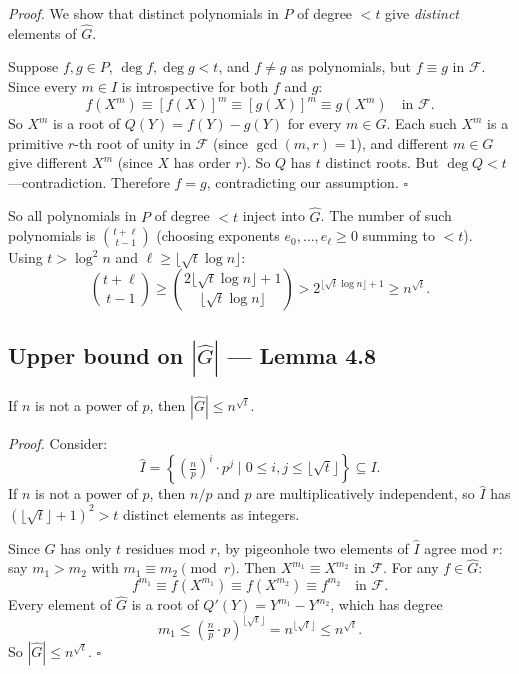 \documentclass[12pt]{article}
\begin{document}
\textit{Proof.} We show that distinct polynomials in $P$ of degree $<t$ give \emph{distinct} elements of $\hat{G}$.

Suppose $f, g\in P$, $\deg f, \deg g < t$, and $f\neq g$ as polynomials, but $f\equiv g$ in $\mathcal{F}$. Since every $m\in I$ is introspective for both $f$ and $g$:
\[
  f(X^m)\equiv[f(X)]^m\equiv[g(X)]^m\equiv g(X^m) \quad\text{in }\mathcal{F}.
\]
So $X^m$ is a root of $Q(Y)=f(Y)-g(Y)$ for every $m\in G$. Each such $X^m$ is a primitive $r$-th root of unity in $\mathcal{F}$ (since $\gcd(m,r)=1$), and different $m\in G$ give different $X^m$ (since $X$ has order $r$). So $Q$ has $t$ distinct roots. But $\deg Q < t$---contradiction. Therefore $f=g$, contradicting our assumption. $\square$

So all polynomials in $P$ of degree $<t$ inject into $\hat{G}$. The number of such polynomials is $\binom{t+\ell}{t-1}$ (choosing exponents $e_0,\ldots,e_\ell\geq 0$ summing to $<t$). Using $t>\log^2 n$ and $\ell\geq\lfloor\sqrt{t}\log n\rfloor$:
\[
  \binom{t+\ell}{t-1}\geq\binom{2\lfloor\sqrt{t}\log n\rfloor+1}{\lfloor\sqrt{t}\log n\rfloor} > 2^{\lfloor\sqrt{t}\log n\rfloor+1} \geq n^{\sqrt{t}}.
\]

\subsection{Upper bound on $|\hat{G}|$ --- Lemma 4.8}

\begin{thmbox}[Lemma 4.8]
If $n$ is not a power of $p$, then $|\hat{G}|\leq n^{\sqrt{t}}$.
\end{thmbox}

\textit{Proof.} Consider:
\[
  \hat{I} = \left\{\left(\tfrac{n}{p}\right)^i\cdot p^j \;\Big|\; 0\leq i,j\leq\lfloor\sqrt{t}\rfloor\right\} \subseteq I.
\]
If $n$ is not a power of $p$, then $n/p$ and $p$ are multiplicatively independent, so $\hat{I}$ has $(\lfloor\sqrt{t}\rfloor+1)^2 > t$ distinct elements as integers.

Since $G$ has only $t$ residues mod $r$, by pigeonhole two elements of $\hat{I}$ agree mod $r$: say $m_1 > m_2$ with $m_1\equiv m_2\pmod{r}$. Then $X^{m_1}\equiv X^{m_2}$ in $\mathcal{F}$. For any $f\in\hat{G}$:
\[
  f^{m_1} \equiv f(X^{m_1}) \equiv f(X^{m_2}) \equiv f^{m_2} \quad\text{in }\mathcal{F}.
\]
Every element of $\hat{G}$ is a root of $Q'(Y)=Y^{m_1}-Y^{m_2}$, which has degree
\[
  m_1\leq\left(\tfrac{n}{p}\cdot p\right)^{\lfloor\sqrt{t}\rfloor} = n^{\lfloor\sqrt{t}\rfloor}\leq n^{\sqrt{t}}.
\]
So $|\hat{G}|\leq n^{\sqrt{t}}$. $\square$
\end{document}
